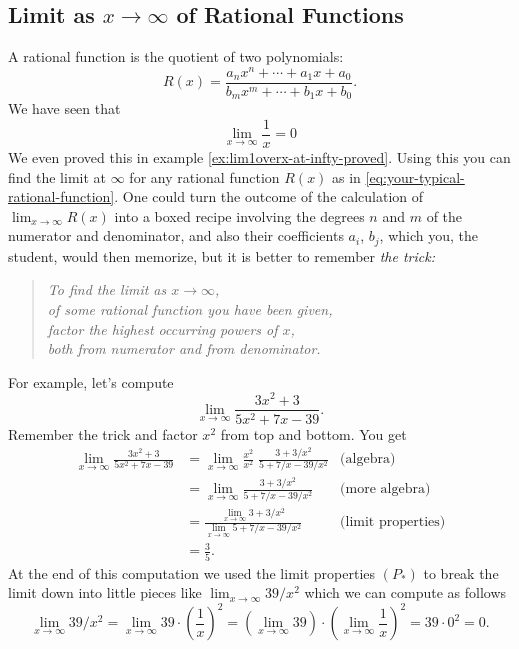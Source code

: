 \subsection{Limit as $x\to\infty$ of Rational Functions}
\label{sec:lim-at-infty-of-rationalfunction}%
A rational function is the quotient of two polynomials:
\begin{equation}\label{eq:your-typical-rational-function}
  R(x) = \frac{a_nx^n+\cdots +a_1x+a_0}{b_mx^m+\cdots+b_1x+b_0}.
\end{equation}
We have seen that
\[
\lim_{x\to\infty} \frac 1x =0
\]
We even proved this in example \ref{ex:lim1overx-at-infty-proved}.  Using
this you can find the limit at $\infty$ for any rational function $R(x)$ as
in \eqref{eq:your-typical-rational-function}.  One could turn the outcome
of the calculation of $\lim_{x\to\infty}R(x)$ into a boxed recipe
involving the degrees $n$ and $m$ of the numerator and denominator, and
also their coefficients $a_i$, $b_j$, which you, the student, would then memorize,
but it is better to remember {\itshape the trick:}
\begin{verse}\itshape
  To find the limit as $x\to\infty$,\\
  of some rational function you have been given,\\
  factor the highest occurring powers of $x$,\\
  both from numerator and from denominator.
\end{verse}
For example, let's compute
\[
\lim_{x\to\infty}\frac{3x^2+3}{5x^2+7x-39}.
\]
Remember the trick and factor $x^2$ from top and bottom. You get
\begin{align*}
  \lim_{x\to\infty}\frac{3x^2+3}{5x^2+7x-39}
  &= \lim_{x\to\infty}\frac{x^2}{x^2} \; \frac{3+3/x^2}{5+7/x-39/x^2}
  & \text{(algebra)}\\
  &= \lim_{x\to\infty}\frac{3+3/x^2}{5+7/x-39/x^2}& \text{(more algebra)}\\
  &= \frac{\lim_{x\to\infty}3+3/x^2}{\lim_{x\to\infty}5+7/x-39/x^2}
  &\text{(limit properties)}\\
  &= \frac35.
\end{align*}
At the end of this computation we used the limit properties
$(P_\ast)$ to break the limit down into little pieces like
$\lim_{x\to\infty}39/x^2$ which we can compute as follows
\[
\lim_{x\to\infty} 39/x^2 =\lim_{x\to\infty} 39\cdot \left( \frac1x
\right)^2 = \left( \lim_{x\to\infty}39\right)\cdot \left(
  \lim_{x\to\infty}\frac1x \right)^2 = 39 \cdot 0^2 =0.
\]
